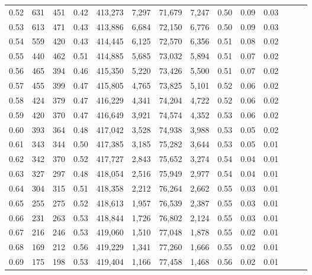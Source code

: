 \begin{tabular}{rrrrrrrrrrrrrr}
0.52 &     631 &    451 &  0.42 &  413,273 &    7,297 &  71,679 &   7,247 &  0.50 &  0.09 &      0.03 \\
0.53 &     613 &    471 &  0.43 &  413,886 &    6,684 &  72,150 &   6,776 &  0.50 &  0.09 &      0.03 \\
0.54 &     559 &    420 &  0.43 &  414,445 &    6,125 &  72,570 &   6,356 &  0.51 &  0.08 &      0.02 \\
0.55 &     440 &    462 &  0.51 &  414,885 &    5,685 &  73,032 &   5,894 &  0.51 &  0.07 &      0.02 \\
0.56 &     465 &    394 &  0.46 &  415,350 &    5,220 &  73,426 &   5,500 &  0.51 &  0.07 &      0.02 \\
0.57 &     455 &    399 &  0.47 &  415,805 &    4,765 &  73,825 &   5,101 &  0.52 &  0.06 &      0.02 \\
0.58 &     424 &    379 &  0.47 &  416,229 &    4,341 &  74,204 &   4,722 &  0.52 &  0.06 &      0.02 \\
0.59 &     420 &    370 &  0.47 &  416,649 &    3,921 &  74,574 &   4,352 &  0.53 &  0.06 &      0.02 \\
0.60 &     393 &    364 &  0.48 &  417,042 &    3,528 &  74,938 &   3,988 &  0.53 &  0.05 &      0.02 \\
0.61 &     343 &    344 &  0.50 &  417,385 &    3,185 &  75,282 &   3,644 &  0.53 &  0.05 &      0.01 \\
0.62 &     342 &    370 &  0.52 &  417,727 &    2,843 &  75,652 &   3,274 &  0.54 &  0.04 &      0.01 \\
0.63 &     327 &    297 &  0.48 &  418,054 &    2,516 &  75,949 &   2,977 &  0.54 &  0.04 &      0.01 \\
0.64 &     304 &    315 &  0.51 &  418,358 &    2,212 &  76,264 &   2,662 &  0.55 &  0.03 &      0.01 \\
0.65 &     255 &    275 &  0.52 &  418,613 &    1,957 &  76,539 &   2,387 &  0.55 &  0.03 &      0.01 \\
0.66 &     231 &    263 &  0.53 &  418,844 &    1,726 &  76,802 &   2,124 &  0.55 &  0.03 &      0.01 \\
0.67 &     216 &    246 &  0.53 &  419,060 &    1,510 &  77,048 &   1,878 &  0.55 &  0.02 &      0.01 \\
0.68 &     169 &    212 &  0.56 &  419,229 &    1,341 &  77,260 &   1,666 &  0.55 &  0.02 &      0.01 \\
0.69 &     175 &    198 &  0.53 &  419,404 &    1,166 &  77,458 &   1,468 &  0.56 &  0.02 &      0.01 \\

\end{tabular}
